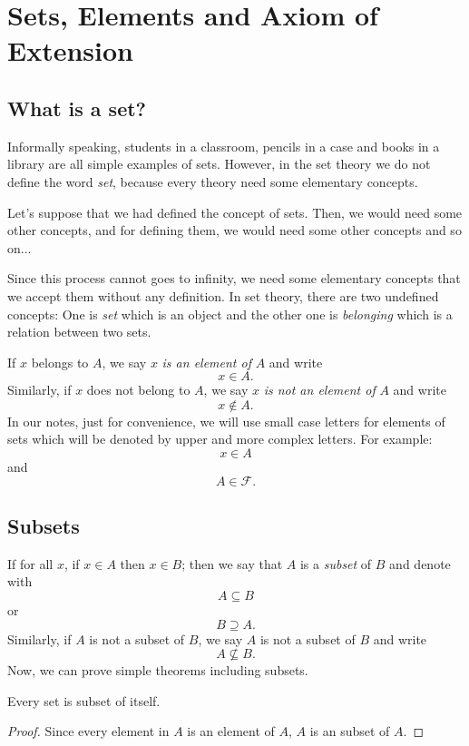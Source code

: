 \section{Sets, Elements and Axiom of Extension}

\subsection{What is a set?}
\indent Informally speaking, students in a classroom, pencils
in a case and books in a library are all simple examples
of sets.
However, in the set theory we do not define the word 
\textit{set}, because every theory need some elementary concepts.

Let's suppose that we had defined the concept of sets.
Then, we would need some other concepts, and for defining 
them, we would need some other concepts and so on...

Since this process cannot goes to infinity, we need some
elementary concepts that we accept them without any definition.
In set theory, there are two undefined concepts: One is \textit{set} 
which is an object and the other one is \textit{belonging} 
which is a relation between two sets.

If $x$ belongs to $A$, we say $x$ \textit{is an element of} $A$ and write 
\[ x \in A. \]
Similarly, if $x$ does not belong to $A$, we say $x$ \textit{is not an element of}
$A$ and write \[ x \not\in A. \]
In our notes, just for convenience, we will use small case letters for elements of 
sets which will be denoted by upper and more complex letters. For example:
\[x \in A\] and \[A \in \mathcal{F}.\]

\subsection{Subsets}
If for all $x$, if $x \in A$ then $x \in B$; then we say that $A$ is a \textit{subset} 
of $B$ and denote with \[A \subseteq B\] or \[B \supseteq A.\]
Similarly, if $A$ is not a subset of $B$, we say $A$ is not a subset of $B$
and write \[A \not\subseteq B.\]
Now, we can prove simple theorems including subsets.

\begin{theorem*} Every set is subset of itself. \end{theorem*}
\begin{proof}[Proof]
   Since every element in $A$ is an element of $A$, $A$ is an subset of $A$. 
\end{proof}

